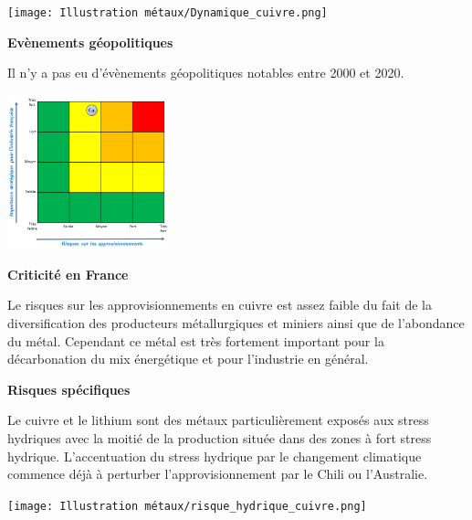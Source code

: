 \clearpage
\begin{center}
\texttt{[image: Illustration métaux/Dynamique\_cuivre.png]}
\end{center}
\begin{center}
    \textbf{Evènements géopolitiques}
\end{center}
Il n'y a pas eu d'évènements géopolitiques notables entre 2000 et 2020.

\begin{multicols}{2}
    \begin{center}
      \includegraphics[width=0.35\textwidth]{Illustration métaux/Cuivre_criticité.png} 
    \end{center}
    \begin{center}
    \textbf{Criticité en France}
    \end{center}
    Le risques sur les approvisionnements en cuivre est assez faible du fait de la diversification des producteurs
    métallurgiques et miniers ainsi que de l'abondance du métal. Cependant ce métal est très fortement important pour
    la décarbonation du mix énergétique et pour l'industrie en général.
\end{multicols}

\begin{center}
\textbf{Risques spécifiques}
\end{center}
Le cuivre et le lithium sont des métaux particulièrement exposés aux stress hydriques avec la moitié de la production située dans des zones à fort stress hydrique. L'accentuation du stress hydrique par le changement climatique commence déjà à perturber l'approvisionnement par le Chili ou l'Australie.
\begin{center}
    \texttt{[image: Illustration métaux/risque\_hydrique\_cuivre.png]} 
\end{center}
